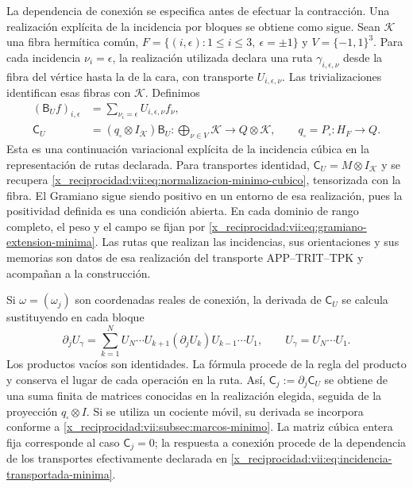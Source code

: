 La dependencia de conexión se especifica antes de efectuar la
contracción. Una realización explícita de la incidencia por bloques
se obtiene como sigue. Sean \(\mathcal K\) una fibra hermítica común,
\(F=\{(i,\epsilon):1\leq i\leq3,\ \epsilon=\pm1\}\) y
\(V=\{-1,1\}^3\). Para cada incidencia \(\nu_i=\epsilon\),
la realización utilizada declara una ruta \(\gamma_{i,\epsilon,\nu}\)
desde la fibra del vértice hasta la de la cara, con transporte
\(U_{i,\epsilon,\nu}\). Las trivializaciones identifican esas fibras
con \(\mathcal K\). Definimos
\begin{equation}
 \begin{split}
 (\mathsf B_Uf)_{i,\epsilon}
   &=\sum_{\nu_i=\epsilon}U_{i,\epsilon,\nu}f_\nu,\\
 \mathsf C_U&=(q_\square\otimes I_{\mathcal K})\mathsf B_U:
   \bigoplus_{\nu\in V}\mathcal K\longrightarrow Q\otimes\mathcal K,
 \qquad q_\square=P_\square:H_F\to Q.
 \end{split}
 \label{x_reciprocidad:vii:eq:incidencia-transportada-minima}
\end{equation}
Esta es una continuación variacional explícita de la incidencia cúbica
en la representación de rutas declarada. Para transportes identidad,
\(\mathsf C_U=M\otimes I_{\mathcal K}\) y se recupera
\eqref{x_reciprocidad:vii:eq:normalizacion-minimo-cubico}, tensorizada con la fibra.
El Gramiano sigue siendo positivo en un entorno de esa realización,
pues la positividad definida es una condición abierta. En cada dominio
de rango completo, el peso y el campo se fijan por
\eqref{x_reciprocidad:vii:eq:gramiano-extension-minima}. Las rutas que realizan las
incidencias, sus orientaciones y sus memorias son datos de esa
realización del transporte APP--TRIT--TPK y acompañan a la construcción.

Si \(\omega=(\omega_j)\) son coordenadas reales de conexión,
la derivada de \(\mathsf C_U\) se calcula sustituyendo en cada bloque
\begin{equation}
 \partial_j U_\gamma
 =\sum_{k=1}^{N}
    U_N\cdots U_{k+1}(\partial_jU_k)U_{k-1}\cdots U_1,
 \qquad U_\gamma=U_N\cdots U_1.
 \label{x_reciprocidad:vii:eq:derivada-incidencia-rutas}
\end{equation}
Los productos vacíos son identidades. La fórmula procede de la regla
del producto y conserva el lugar de cada operación en la ruta.
Así, \(\mathsf C_j:=\partial_j\mathsf C_U\) se obtiene de una
suma finita de matrices conocidas en la realización elegida, seguida
de la proyección \(q_\square\otimes I\). Si se utiliza un cociente
móvil, su derivada se incorpora conforme a
\ref{x_reciprocidad:vii:subsec:marcos-minimo}. La matriz cúbica entera fija corresponde
al caso \(\mathsf C_j=0\); la respuesta a conexión procede de la
dependencia de los transportes efectivamente declarada en
\eqref{x_reciprocidad:vii:eq:incidencia-transportada-minima}.

